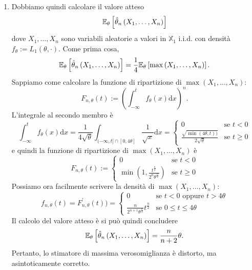 \begin{soluzione}
\begin{enumerate}
  \item Dobbiamo quindi calcolare il valore atteso
    \[
      \mathbb E_{\theta}\left[\hat \theta_n\left(X_1, \dots{},
          X_n\right)\right]
    \]
    dove \(X_1, \dots{}, X_n\) sono variabili aleatorie a valori in
    \(\mathbb{X}_1\) i.i.d. con densità
    \(f_{\theta} := L_1(\theta, \cdot)\). Come prima cosa,
    \[
      \mathbb E_{\theta}\left[\hat \theta_n\left(X_1, \dots{},
          X_n\right)\right] = \frac{1}{4} \mathbb E_{\theta}\left[\max
        \left(X_1, \dots{}, X_n\right)\right] .
    \]
    Sappiamo come calcolare la funzione di ripartizione di
    \(\max \left(X_1, \dots{}, X_n\right)\):
    \[
      F_{n, \theta}(t) := \left( \int_{-\infty}^t f_\theta(x) \mathrm
        d x \right)^n .
    \]
    L'integrale al secondo membro è
    \[
      \int_{-\infty}^t f_{\theta}(x) \mathrm d x = \frac{1}{4 \sqrt
        \theta} \int_{(-\infty, t] \cap [0, 4\theta]}\frac{1}{\sqrt x}
      \mathrm d x =
      \begin{cases}
        0 & \text{se } t < 0 \\
        \frac{\sqrt{\min(4\theta, t))}}{2\sqrt \theta} & \text{se } t \ge 0
      \end{cases}
    \]
    e quindi la funzione di ripartizione di
    \(\max \left( X_1, \dots{}, X_n \right)\) è
    \[
      F_{n, \theta}(t) :=
      \begin{cases}
        0 & \text{se } t < 0 \\
        \min \left( 1, \frac{t^{\frac{n}{2}}}{2^n \theta^{\frac{n}{2}}} \right) & \text{se } t \ge 0
      \end{cases}
    \]
    Possiamo ora facilmente scrivere la densità di
    \(\max \left( X_1, \dots{}, X_n \right)\):
    \[
      f_{n,\theta}(t) = F_{n, \theta}^\prime(t)) =
      \begin{cases}
        0 & \text{se } t < 0 \text{ oppure } t > 4\theta \\
        \frac{n}{2^{n+1}\theta^{\frac{n}{2}}} t^{\frac{n}{2}} & \text{se }
                                                                0 \le t \le 4 \theta
      \end{cases}
    \]
    Il calcolo del valore atteso è si può quindi concludere
    \[
      \mathbb E_\theta\left[\hat \theta_n \left( X_1, \dots{}, X_n
        \right)\right] = \frac{n}{n+2}\theta.
    \]
    Pertanto, lo stimatore di massima verosomiglianza è distorto, ma
    asintoticamente corretto.


\end{enumerate}
\end{soluzione}
